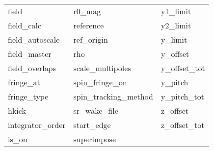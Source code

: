 \begin{tabular}{lll}
field                       & r0_mag                      & y1_limit                    \\
field_calc                  & reference                   & y2_limit                    \\
field_autoscale                & ref_origin                  & y_limit                     \\
field_master                & rho                         & y_offset                    \\
field_overlaps              & scale_multipoles            & y_offset_tot                \\
fringe_at                   & spin_fringe_on              & y_pitch                     \\
fringe_type                 & spin_tracking_method        & y_pitch_tot                 \\
hkick                       & sr_wake_file                & z_offset                    \\
integrator_order            & start_edge                  & z_offset_tot                \\
is_on                       & superimpose                 &                             \\
 \bottomrule
 \end{tabular}
 \vfill
 
